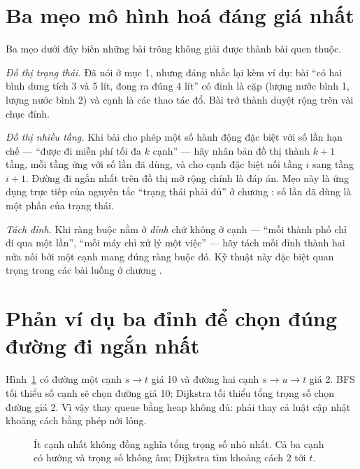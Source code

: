 \documentclass[../../algorithm.tex]{subfiles}
\begin{document}
\section{Ba mẹo mô hình hoá đáng giá nhất}

Ba mẹo dưới đây biến những bài trông không giải được thành bài quen thuộc.

\emph{Đồ thị trạng thái.} Đã nói ở mục 1, nhưng đáng nhắc lại kèm ví dụ: bài ``có hai bình dung tích 3 và 5 lít, đong ra đúng 4 lít'' có đỉnh là cặp (lượng nước bình 1, lượng nước bình 2) và cạnh là các thao tác đổ. Bài trở thành duyệt rộng trên vài chục đỉnh.

\emph{Đồ thị nhiều tầng.} Khi bài cho phép một số hành động đặc biệt với số lần hạn chế --- ``được đi miễn phí tối đa \(k\) cạnh'' --- hãy nhân bản đồ thị thành \(k+1\) tầng, mỗi tầng ứng với số lần đã dùng, và cho cạnh đặc biệt nối tầng \(i\) sang tầng \(i+1\). Đường đi ngắn nhất trên đồ thị mở rộng chính là đáp án. Mẹo này là ứng dụng trực tiếp của nguyên tắc ``trạng thái phải đủ'' ở chương : số lần đã dùng là một phần của trạng thái.

\emph{Tách đỉnh.} Khi ràng buộc nằm ở \emph{đỉnh} chứ không ở cạnh --- ``mỗi thành phố chỉ đi qua một lần'', ``mỗi máy chỉ xử lý một việc'' --- hãy tách mỗi đỉnh thành hai nửa nối bởi một cạnh mang đúng ràng buộc đó. Kỹ thuật này đặc biệt quan trọng trong các bài luồng ở chương .


\section{Phản ví dụ ba đỉnh để chọn đúng đường đi ngắn nhất}

Hình~\ref{fig:review-shortest} có đường một cạnh \(s\to t\) giá 10 và đường hai cạnh \(s\to u\to t\) giá 2.
BFS tối thiểu số cạnh sẽ chọn đường giá 10; Dijkstra tối thiểu tổng trọng số chọn đường giá 2.
Vì vậy thay queue bằng heap không đủ: phải thay cả luật cập nhật khoảng cách bằng phép nới lỏng.

\begin{figure}[H]\centering
{}
\caption{Ít cạnh nhất không đồng nghĩa tổng trọng số nhỏ nhất. Cả ba cạnh có hướng và trọng số không âm; Dijkstra tìm khoảng cách 2 tới \(t\).}
\label{fig:review-shortest}
\end{figure}
\end{document}
